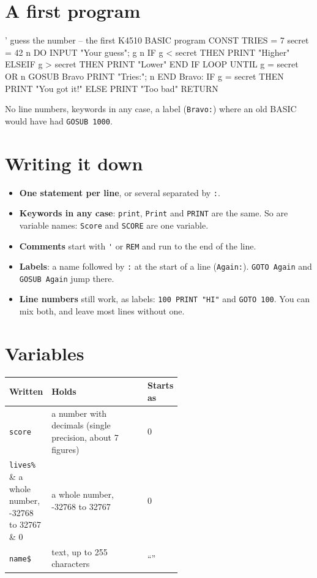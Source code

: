 \section{A first program}

\begin{type}
' guess the number -- the first K4510 BASIC program
CONST TRIES = 7
secret = 42
n%
DO
  INPUT "Your guess"; g
  n%
  IF g < secret THEN
    PRINT "Higher"
  ELSEIF g > secret THEN
    PRINT "Lower"
  END IF
LOOP UNTIL g = secret OR n%
GOSUB Bravo
PRINT "Tries:"; n%
END
Bravo:
  IF g = secret THEN PRINT "You got it!" ELSE PRINT "Too bad"
  RETURN
\end{type}

No line numbers, keywords in any case, a label (\verb|Bravo:|) where an old
BASIC would have had \texttt{GOSUB 1000}.

\section{Writing it down}

\begin{itemize}
\item \textbf{One statement per line}, or several separated by \verb|:|.
\item \textbf{Keywords in any case}: \verb|print|, \verb|Print| and \verb|PRINT| are the same. So are variable names: \verb|Score| and \verb|SCORE| are one variable.
\item \textbf{Comments} start with \verb|'| or \verb|REM| and run to the end of the line.
\item \textbf{Labels}: a name followed by \verb|:| at the start of a line (\verb|Again:|). \texttt{GOTO Again} and \texttt{GOSUB Again} jump there.
\item \textbf{Line numbers} still work, as labels: \texttt{100 PRINT "HI"} and \texttt{GOTO 100}. You can mix both, and leave most lines without one.
\end{itemize}

\section{Variables}

\begin{center}
\small
\begin{tabular}{@{}l >{\raggedright\arraybackslash}p{0.56\linewidth} l@{}}
\toprule
\textbf{Written} & \textbf{Holds} & \textbf{Starts as} \\
\midrule
\verb|score| & a number with decimals (single precision, about 7 figures) & 0 \\
\verb|lives%| & a whole number, -32768 to 32767 & 0 \\
\verb|name$| & text, up to 255 characters & ``'' \\
\bottomrule
\end{tabular}
\end{center}

